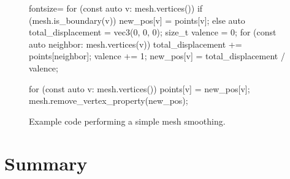 \begin{figure}[p]
\begin{minipage}{.9\textwidth}
\begin{cppcode*}{fontsize=\footnotesize}
      for (const auto v: mesh.vertices()) {
          if (mesh.is_boundary(v)) {
              new_pos[v] = points[v];
          } else {
              auto total_displacement = vec3(0, 0, 0);
              size_t valence = 0;
              for (const auto neighbor: mesh.vertices(v)) {
                  total_displacement += points[neighbor];
                  valence += 1;
              }
              new_pos[v] = total_displacement / valence;
          }
      }

      for (const auto v: mesh.vertices()) {
          points[v] = new_pos[v];
      }
      mesh.remove_vertex_property(new_pos);
    \end{cppcode*}
  \end{minipage}

  \caption{
    Example code performing a simple mesh smoothing.
  }
\end{figure}


\newpage
\section{Summary}

\lipsum[1]
